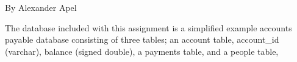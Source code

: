 By Alexander Apel

The database included with this assignment is a simplified 
example accounts payable database consisting of three tables;
an account table, account_id (varchar), balance (signed double), 
a payments table,
and a people table,
